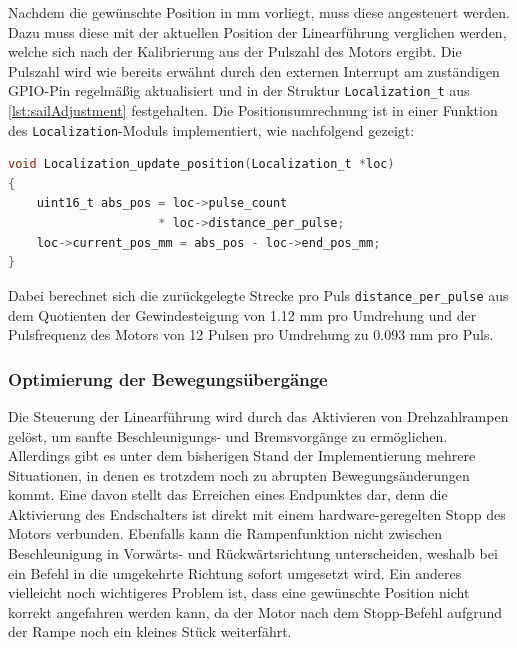 \noindent
Nachdem die gewünschte Position in mm vorliegt, muss diese angesteuert werden. Dazu muss diese mit der aktuellen Position der Linearführung verglichen werden, welche sich nach der Kalibrierung aus der Pulszahl des Motors ergibt. Die Pulszahl wird wie bereits erwähnt durch den externen Interrupt am zuständigen GPIO-Pin regelmäßig aktualisiert und in der Struktur \verb|Localization_t| aus \autoref{lst:sailAdjustment} festgehalten. Die Positionsumrechnung ist in einer Funktion des \verb|Localization|-Moduls implementiert, wie nachfolgend gezeigt:
\begin{lstlisting}[language=C, caption={Positionsberechnung aus dem Pulssignal des Motors}, label={lst:pulseToPos}]
void Localization_update_position(Localization_t *loc)
{
	uint16_t abs_pos = loc->pulse_count
	                 * loc->distance_per_pulse;
	loc->current_pos_mm = abs_pos - loc->end_pos_mm;
}
\end{lstlisting}
Dabei berechnet sich die zurückgelegte Strecke pro Puls \verb|distance_per_pulse| aus dem Quotienten der Gewindesteigung von 1.12 mm pro Umdrehung und der Pulsfrequenz des Motors von 12 Pulsen pro Umdrehung zu 0.093 mm pro Puls.
\subsubsection{Optimierung der Bewegungsübergänge}
Die Steuerung der Linearführung wird durch das Aktivieren von Drehzahlrampen gelöst, um sanfte Beschleunigungs- und Bremsvorgänge zu ermöglichen. Allerdings gibt es unter dem bisherigen Stand der Implementierung mehrere Situationen, in denen es trotzdem noch zu abrupten Bewegungsänderungen kommt. Eine davon stellt das Erreichen eines Endpunktes dar, denn die Aktivierung des Endschalters ist direkt mit einem hardware-geregelten Stopp des Motors verbunden. Ebenfalls kann die Rampenfunktion nicht zwischen Beschleunigung in Vorwärts- und Rückwärtsrichtung unterscheiden, weshalb bei ein Befehl in die umgekehrte Richtung sofort umgesetzt wird. Ein anderes vielleicht noch wichtigeres Problem ist, dass eine gewünschte Position nicht korrekt angefahren werden kann, da der Motor nach dem Stopp-Befehl aufgrund der Rampe noch ein kleines Stück weiterfährt.\\


